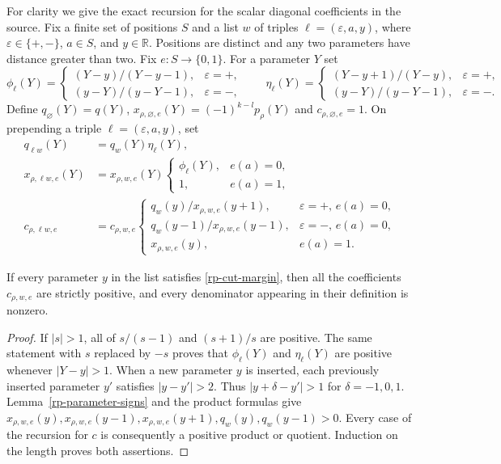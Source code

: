 For clarity we give the exact recursion for the scalar
diagonal coefficients in the source.  Fix a finite set
of positions $S$ and a list $w$ of triples
$\ell=(\varepsilon,a,y)$, where
$\varepsilon\in\{+,-\}$, $a\in S$, and $y\in\mathbb R$.
Positions are distinct and any two parameters have
distance greater than two.  Fix
$e:S\to\{0,1\}$.  For a parameter $Y$ set
\[
 \phi_\ell(Y)=
 \begin{cases}(Y-y)/(Y-y-1),&\varepsilon=+,\\
               (y-Y)/(y-Y-1),&\varepsilon=-,
 \end{cases}
 \qquad
 \eta_\ell(Y)=
 \begin{cases}(Y-y+1)/(Y-y),&\varepsilon=+,\\
               (y-Y)/(y-Y-1),&\varepsilon=-.
 \end{cases}
\]
Define $q_\varnothing(Y)=q(Y)$,
$x_{\rho,\varnothing,e}(Y)=(-1)^{k-l}p_\rho(Y)$
and $c_{\rho,\varnothing,e}=1$.  On prepending a triple
$\ell=(\varepsilon,a,y)$, set
\begin{align*}
 q_{\ell w}(Y)&=q_w(Y)\eta_\ell(Y),\\
 x_{\rho,\ell w,e}(Y)&=
       x_{\rho,w,e}(Y)
           \begin{cases}\phi_\ell(Y),&e(a)=0,\\1,&e(a)=1,\end{cases}\\
 c_{\rho,\ell w,e}&=c_{\rho,w,e}
   \begin{cases}
      q_w(y)/x_{\rho,w,e}(y+1),&\varepsilon=+,\,e(a)=0,\\
      q_w(y-1)/x_{\rho,w,e}(y-1),&\varepsilon=-,\,e(a)=0,\\
      x_{\rho,w,e}(y),&e(a)=1 .
   \end{cases}
\end{align*}

\begin{lemma}\label{rp-recursive-positive}
If every parameter $y$ in the list satisfies
\eqref{rp-cut-margin}, then all the coefficients
$c_{\rho,w,e}$ are strictly positive, and every
denominator appearing in their definition is nonzero.
\end{lemma}

\begin{proof}
If $|s|>1$, all of $s/(s-1)$ and $(s+1)/s$ are
positive.  The same statement with $s$ replaced by
$-s$ proves that $\phi_\ell(Y)$ and $\eta_\ell(Y)$
are positive whenever $|Y-y|>1$.
When a new parameter $y$ is inserted, each previously
inserted parameter $y'$ satisfies $|y-y'|>2$.
Thus $|y+\delta-y'|>1$ for $\delta=-1,0,1$.
Lemma~\ref{rp-parameter-signs} and the product formulas
give
$x_{\rho,w,e}(y),x_{\rho,w,e}(y-1),
x_{\rho,w,e}(y+1),q_w(y),q_w(y-1)>0$.
Every case of the recursion for $c$ is consequently a
positive product or quotient.  Induction on the length
proves both assertions.
\end{proof}

